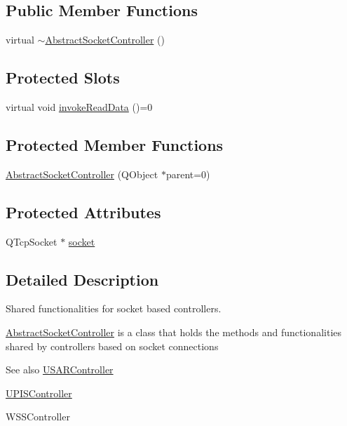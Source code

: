 \subsection*{Public Member Functions}
\begin{DoxyCompactItemize}
\item 
virtual \hyperlink{classAbstractSocketController_a62f22568654956a18a108f81ca18cda5}{$\sim$AbstractSocketController} ()
\end{DoxyCompactItemize}
\subsection*{Protected Slots}
\begin{DoxyCompactItemize}
\item 
virtual void \hyperlink{classAbstractSocketController_a3816ceb3b12f0028dea99d010349ec41}{invokeReadData} ()=0
\end{DoxyCompactItemize}
\subsection*{Protected Member Functions}
\begin{DoxyCompactItemize}
\item 
\hyperlink{classAbstractSocketController_a1e51beb8c90ce4f69a57d6464812f177}{AbstractSocketController} (QObject $\ast$parent=0)
\end{DoxyCompactItemize}
\subsection*{Protected Attributes}
\begin{DoxyCompactItemize}
\item 
QTcpSocket $\ast$ \hyperlink{classAbstractSocketController_aa979beef2f78be052f3e7f3255cdc644}{socket}
\end{DoxyCompactItemize}


\subsection{Detailed Description}
Shared functionalities for socket based controllers. 

\hyperlink{classAbstractSocketController}{AbstractSocketController} is a class that holds the methods and functionalities shared by controllers based on socket connections

\begin{DoxySeeAlso}{See also}
\hyperlink{classUSARController}{USARController} 

\hyperlink{classUPISController}{UPISController} 

WSSController 
\end{DoxySeeAlso}


